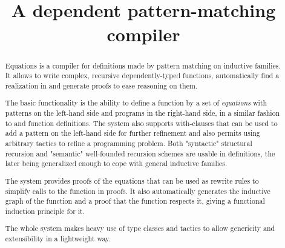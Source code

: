 \documentclass[9pt]{sigplanconf}
\title{\Equations\\
  A dependent pattern-matching compiler}
\begin{document}
\maketitle

\begin{abstract}
  Equations is a compiler for definitions made by pattern matching on
  inductive families. It allows to write complex, recursive
  dependently-typed functions, automatically find a realization in \Coq 
  and generate proofs to ease reasoning on them.

  The basic functionality is the ability to define a function by a set
  of \textit{equations} with patterns on the left-hand side and programs
  in the right-hand side, in a similar fashion to \Haskell and \Agda
  function definitions. The system also supports with-clauses that can
  be used to add a pattern on the left-hand side for further refinement
  and also permits using arbitrary tactics to refine a programming
  problem. Both "syntactic" structural recursion and "semantic" well-founded 
  recursion schemes are usable in definitions, the later being
  generalized enough to cope with general inductive families.
  
  The system provides proofs of the equations that can be used as
  rewrite rules to simplify calls to the function in proofs. It also
  automatically generates the inductive graph of the function and a
  proof that the function respects it, giving a functional induction
  principle for it. 
  
  The whole system makes heavy use of type classes and \Ltac{} tactics to
  allow genericity and extensibility in a lightweight way.
\end{abstract}






  


\end{document}
